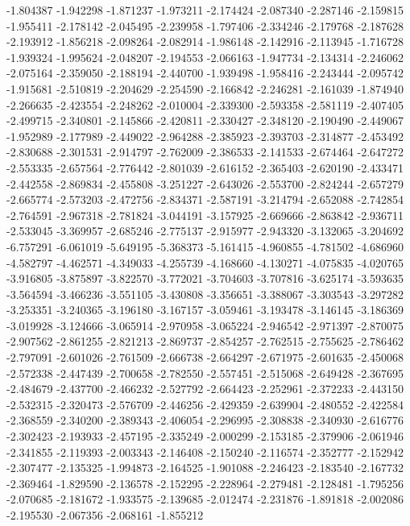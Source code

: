 -1.804387
-1.942298
-1.871237
-1.973211
-2.174424
-2.087340
-2.287146
-2.159815
-1.955411
-2.178142
-2.045495
-2.239958
-1.797406
-2.334246
-2.179768
-2.187628
-2.193912
-1.856218
-2.098264
-2.082914
-1.986148
-2.142916
-2.113945
-1.716728
-1.939324
-1.995624
-2.048207
-2.194553
-2.066163
-1.947734
-2.134314
-2.246062
-2.075164
-2.359050
-2.188194
-2.440700
-1.939498
-1.958416
-2.243444
-2.095742
-1.915681
-2.510819
-2.204629
-2.254590
-2.166842
-2.246281
-2.161039
-1.874940
-2.266635
-2.423554
-2.248262
-2.010004
-2.339300
-2.593358
-2.581119
-2.407405
-2.499715
-2.340801
-2.145866
-2.420811
-2.330427
-2.348120
-2.190490
-2.449067
-1.952989
-2.177989
-2.449022
-2.964288
-2.385923
-2.393703
-2.314877
-2.453492
-2.830688
-2.301531
-2.914797
-2.762009
-2.386533
-2.141533
-2.674464
-2.647272
-2.553335
-2.657564
-2.776442
-2.801039
-2.616152
-2.365403
-2.620190
-2.433471
-2.442558
-2.869834
-2.455808
-3.251227
-2.643026
-2.553700
-2.824244
-2.657279
-2.665774
-2.573203
-2.472756
-2.834371
-2.587191
-3.214794
-2.652088
-2.742854
-2.764591
-2.967318
-2.781824
-3.044191
-3.157925
-2.669666
-2.863842
-2.936711
-2.533045
-3.369957
-2.685246
-2.775137
-2.915977
-2.943320
-3.132065
-3.204692
-6.757291
-6.061019
-5.649195
-5.368373
-5.161415
-4.960855
-4.781502
-4.686960
-4.582797
-4.462571
-4.349033
-4.255739
-4.168660
-4.130271
-4.075835
-4.020765
-3.916805
-3.875897
-3.822570
-3.772021
-3.704603
-3.707816
-3.625174
-3.593635
-3.564594
-3.466236
-3.551105
-3.430808
-3.356651
-3.388067
-3.303543
-3.297282
-3.253351
-3.240365
-3.196180
-3.167157
-3.059461
-3.193478
-3.146145
-3.186369
-3.019928
-3.124666
-3.065914
-2.970958
-3.065224
-2.946542
-2.971397
-2.870075
-2.907562
-2.861255
-2.821213
-2.869737
-2.854257
-2.762515
-2.755625
-2.786462
-2.797091
-2.601026
-2.761509
-2.666738
-2.664297
-2.671975
-2.601635
-2.450068
-2.572338
-2.447439
-2.700658
-2.782550
-2.557451
-2.515068
-2.649428
-2.367695
-2.484679
-2.437700
-2.466232
-2.527792
-2.664423
-2.252961
-2.372233
-2.443150
-2.532315
-2.320473
-2.576709
-2.446256
-2.429359
-2.639904
-2.480552
-2.422584
-2.368559
-2.340200
-2.389343
-2.406054
-2.296995
-2.308838
-2.340930
-2.616776
-2.302423
-2.193933
-2.457195
-2.335249
-2.000299
-2.153185
-2.379906
-2.061946
-2.341855
-2.119393
-2.003343
-2.146408
-2.150240
-2.116574
-2.352777
-2.152942
-2.307477
-2.135325
-1.994873
-2.164525
-1.901088
-2.246423
-2.183540
-2.167732
-2.369464
-1.829590
-2.136578
-2.152295
-2.228964
-2.279481
-2.128481
-1.795256
-2.070685
-2.181672
-1.933575
-2.139685
-2.012474
-2.231876
-1.891818
-2.002086
-2.195530
-2.067356
-2.068161
-1.855212
